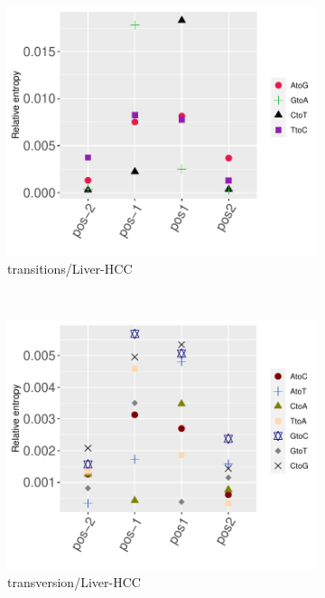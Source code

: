 \begin{figure}[ht!]
    \begin{subfigure}{.5\textwidth}
    \includegraphics[scale=0.63]{graphics/nbr_transitions_Liver-HCC.pdf}
    \caption{transitions/Liver-HCC}
    \label{fig:transitions_liver}
    \end{subfigure}
    ~
    \begin{subfigure}{.5\textwidth}
    \includegraphics[scale=0.63]{graphics/nbr_transversion_Liver-HCC.pdf}
    \caption{transversion/Liver-HCC}
    \label{fig:transversion_liver}
    \end{subfigure} \\
\caption{}    
    \label{fig:nbr}
\end{figure}